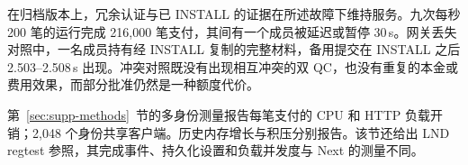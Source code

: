 在归档版本上，冗余认证与已 INSTALL 的证据在所述故障下维持服务。九次每秒 200 笔的运行完成 216,000 笔支付，其间有一个成员被延迟或暂停 30\,s。网关丢失对照中，一名成员持有经 INSTALL 复制的完整材料，备用提交在 INSTALL 之后 2.503--2.508\,s 出现。冲突对照既没有出现相互冲突的双 QC，也没有重复的本金或费用效果，而部分批准仍然是一种额度代价。

第~\ref{sec:supp-methods}~节的多身份测量报告每笔支付的 CPU 和 HTTP 负载开销；2,048 个身份共享客户端。历史内存增长与积压分别报告。该节还给出 LND regtest 参照，其完成事件、持久化设置和负载并发度与 Next 的测量不同。
